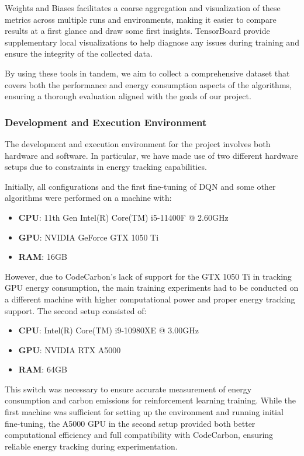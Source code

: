 Weights and Biases facilitates a coarse aggregation and visualization of these metrics across multiple runs and environments, making it easier to compare results at a first glance and draw some first insights. TensorBoard provide supplementary local visualizations to help diagnose any issues during training and ensure the integrity of the collected data.

By using these tools in tandem, we aim to collect a comprehensive dataset that covers both the performance and energy consumption aspects of the algorithms, ensuring a thorough evaluation aligned with the goals of our project.

\subsubsection{Development and Execution Environment}
\label{subsubsec:development_execution_environment}

The development and execution environment for the project involves both hardware and software. In particular, we have made use of two different hardware setups due to constraints in energy tracking capabilities.

Initially, all configurations and the first fine-tuning of DQN and some other algorithms were performed on a machine with:
\begin{itemize}
	\item \textbf{CPU}: 11th Gen Intel(R) Core(TM) i5-11400F @ 2.60GHz
	\item \textbf{GPU}: NVIDIA GeForce GTX 1050 Ti
	\item \textbf{RAM}: 16GB
\end{itemize}

However, due to CodeCarbon's lack of support for the GTX 1050 Ti in tracking GPU energy consumption, the main training experiments had to be conducted on a different machine with higher computational power and proper energy tracking support. The second setup consisted of:
\begin{itemize}
	\item \textbf{CPU}: Intel(R) Core(TM) i9-10980XE @ 3.00GHz
	\item \textbf{GPU}: NVIDIA RTX A5000
	\item \textbf{RAM}: 64GB
\end{itemize}

This switch was necessary to ensure accurate measurement of energy consumption and carbon emissions for reinforcement learning training. While the first machine was sufficient for setting up the environment and running initial fine-tuning, the A5000 GPU in the second setup provided both better computational efficiency and full compatibility with CodeCarbon, ensuring reliable energy tracking during experimentation.


